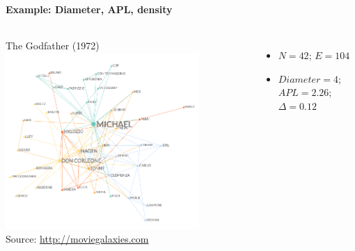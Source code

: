 \documentclass[8pt]{beamer}
\begin{document}


\begin{frame}[fragile]
\frametitle{\insertsection}
\framesubtitle{Example: Diameter, APL, density}


\begin{columns}[c]

\begin{minipage}[c][.5\textheight][c]{\linewidth}

\medskip
\centering
\footnotesize The Godfather (1972)
\includegraphics[width = 0.8\textwidth, keepaspectratio]{gf1}\\
\tiny Source: \url{http://moviegalaxies.com}

\footnotesize
\begin{itemize}
\item $N = 42$; $E = 104$
\item $Diameter = 4$; $APL = 2.26$; $\Delta = 0.12$
\end{itemize}


\end{minipage}	   

\begin{minipage}[c][.5\textheight][c]{\linewidth}


\end{minipage}
\end{columns}
\end{frame}
\end{document}
